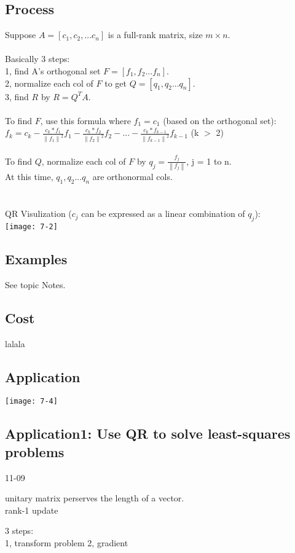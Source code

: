 \documentclass{article}
\begin{document}
\subsection{Process}
Suppose $A = [c_1, c_2, ... c_n]$ is a full-rank matrix, size $m \times n$.\\
\\
Basically 3 steps: \\
1, find A's orthogonal set $F = [f_1, f_2 ... f_n]$.\\
2, normalize each col of $F$ to get $Q = [q_1, q_2 ... q_n]$.\\
3, find $R$ by $R = Q^TA$.\\
\\
To find $F$, use this formula where $f_1 = c_1$ (based on the orthogonal set): \\
$
f_k = c_k - \frac{c_k * f_1}{\left\lVert f_1\right\rVert^2} f_1
- \frac{c_k * f_2}{\left\lVert f_2\right\rVert^2} f_2
- ...
- \frac{c_k * f_{k-1}}{\left\lVert f_{k-1}\right\rVert^2} f_{k-1}
$ (k $>$ 2)
\\
\\
To find $Q$, normalize each col of $F$ by $q_j = \frac{f_j}{\left\lVert f_j\right\rVert }$, j = 1 to n.\\
At this time, $q_1, q_2 ... q_n$ are orthonormal cols.\\
\\
\\
QR Visulization ($c_j$ can be expressed as a linear combination of $q_j$):\\
\texttt{[image: 7-2]}



\subsection*{Examples}
See topic Notes.

\subsection*{Cost}
lalala

\subsection*{Application}
\texttt{[image: 7-4]}\\

\subsection*{Application1: Use QR to solve least-squares problems}
11-09

unitary matrix perserves the length of a vector.\\

rank-1 update

3 steps:\\
1, transform problem %
2, gradient 
\end{document}
